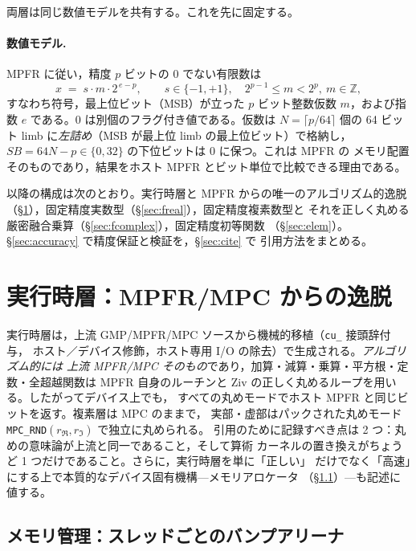 \documentclass[uplatex,dvipdfmx,a4paper,11pt]{jsarticle}
\newcommand{\code}[1]{\texttt{#1}}
\newcommand{\PB}{\ensuremath{p}}
\newcommand{\Nlimb}{\ensuremath{N}}
\begin{document}
両層は同じ数値モデルを共有する。これを先に固定する。

\paragraph{数値モデル.}
MPFR に従い，精度 \PB{} ビットの 0 でない有限数は
\begin{equation}
x \;=\; s \cdot m \cdot 2^{\,e-\PB},
\qquad s\in\{-1,+1\},\quad 2^{\PB-1}\le m < 2^{\PB},\ m\in\mathbb{Z},
\label{eq:model}
\end{equation}
すなわち符号，最上位ビット（MSB）が立った \PB{} ビット整数仮数 $m$，および指数 $e$
である。0 は別個のフラグ付き値である。仮数は $\Nlimb=\lceil \PB/64\rceil$ 個の
64 ビット limb に\emph{左詰め}（MSB が最上位 limb の最上位ビット）で格納し，
$\mathit{SB}=64\Nlimb-\PB\in\{0,32\}$ の下位ビットは 0 に保つ。これは MPFR の
メモリ配置そのものであり，結果をホスト MPFR とビット単位で比較できる理由である。

\medskip
\noindent
以降の構成は次のとおり。実行時層と MPFR からの唯一のアルゴリズム的逸脱
（\S\ref{sec:runtime}），固定精度実数型（\S\ref{sec:freal}），固定精度複素数型と
それを正しく丸める厳密融合乗算（\S\ref{sec:fcomplex}），固定精度初等関数
（\S\ref{sec:elem}）。\S\ref{sec:accuracy} で精度保証と検証を，\S\ref{sec:cite} で
引用方法をまとめる。


\section{実行時層：MPFR/MPC からの逸脱}
\label{sec:runtime}

実行時層は，上流 GMP/MPFR/MPC ソースから機械的移植（\code{cu\_} 接頭辞付与，
ホスト／デバイス修飾，ホスト専用 I/O の除去）で生成される。\emph{アルゴリズム的には
上流 MPFR/MPC そのもの}であり，加算・減算・乗算・平方根・定数・全超越関数は MPFR
自身のルーチンと Ziv の正しく丸めるループを用いる。したがってデバイス上でも，
すべての丸めモードでホスト MPFR と同じビットを返す。複素層は MPC のままで，
実部・虚部はパックされた丸めモード \code{MPC\_RND}$(r_\Re,r_\Im)$ で独立に丸められる。
引用のために記録すべき点は 2 つ：丸めの意味論が上流と同一であること，そして算術
カーネルの置き換えがちょうど 1 つだけであること。さらに，実行時層を単に「正しい」
だけでなく「高速」にする上で本質的なデバイス固有機構---メモリアロケータ
（\S\ref{sec:arena}）---も記述に値する。

\subsection{メモリ管理：スレッドごとのバンプアリーナ}
\label{sec:arena}
\end{document}
